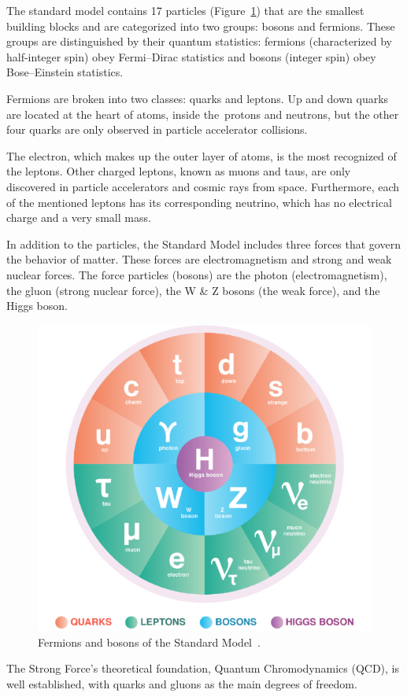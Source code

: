 The standard model contains 17 particles (Figure~\ref{fig_standard})  that are the smallest building blocks and are categorized into two groups: bosons and fermions. These groups are distinguished by their quantum statistics: fermions (characterized by half-integer spin) obey Fermi–Dirac statistics and bosons (integer spin) obey Bose–Einstein statistics. 

Fermions are broken into two classes: quarks and leptons. Up and down quarks are located at the heart of atoms, inside the protons and neutrons, but the other four quarks are only observed in particle accelerator collisions.

The electron, which makes up the outer layer of atoms, is the most recognized of the leptons. Other charged leptons, known as muons and taus, are only discovered in particle accelerators and cosmic rays from space. Furthermore, each of the mentioned leptons has its corresponding neutrino, which has no electrical charge and a very small mass.

In addition to the particles, the Standard Model includes three forces that govern the behavior of matter. These forces are electromagnetism and strong and weak nuclear forces. The force particles (bosons) are the photon (electromagnetism), the gluon (strong nuclear force), the W \& Z bosons (the weak force), and the Higgs boson.

\begin{figure}[!h]
\centering
\includegraphics[width=0.65\columnwidth]{Chapter1/images/particles.png}
\caption{Fermions and bosons of the Standard Model~\cite{standard_model}.}
\label{fig_standard}
\end{figure}



The Strong Force's theoretical foundation, Quantum Chromodynamics (QCD), is well established, with quarks and gluons as the main degrees of freedom.

